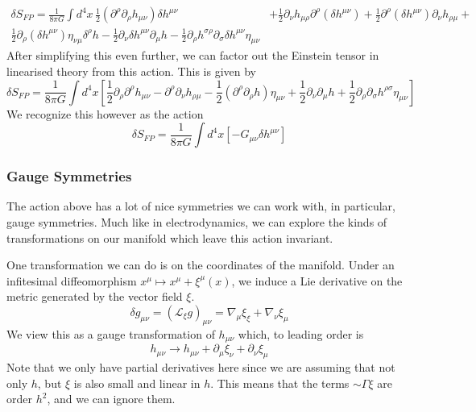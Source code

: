 \begin{align*}
	\delta S _{ FP } = \frac{1}{ 8 \pi G } \int d ^ 4 x \, 
	\frac{1}{2 } \left( \partial  ^ \rho \partial  _ \rho h _{ \mu \nu }  \right)
	\delta h^{ \mu \nu } & + \frac{1}{2 } \partial  _ \nu 
	h _{ \mu \rho } \partial  ^ \rho \left( \delta h ^{ \mu \nu }  \right) 
	+ \frac{1}{2 } \partial  ^ \rho \left( \delta h ^{ \mu \nu }  \right) 
	\partial  _ \nu h _{ \rho \mu } + \\ \frac{1}{2 } 
	\partial  _ \rho \left( \delta h ^{ \mu \nu }   \right)  \eta _{ \nu \mu } 
	\delta ^ \rho h - \frac{1}{2 } \partial  _ \nu \delta h^{ \mu \nu } \partial  _ \mu h - \frac{1}{2 } \partial  _ \rho h ^{ \sigma \rho } \partial  _ \sigma \delta h ^{ \mu \nu } \eta _{ \mu \nu } 
\end{align*}
After simplifying this even further, 
we can factor out the Einstein tensor in 
linearised theory from this action. 
This is given by 
\[
	\delta S _{ FP }  = \frac{1}{8 \pi G } 
	\int d^ 4 x \left[ \frac{1}{2 } \partial  _ \rho \partial  ^ \rho 
	h _{ \mu \nu }  - \partial  ^ \rho \partial  _ \nu h _{ \rho \mu } 
- \frac{1}{2 } \left( \partial  ^ \rho \partial  _ \rho h  \right)  \eta _{ \mu \nu } + \frac{1}{2 } \partial  _ \nu \partial  _ \mu h + \frac{1}{2 } \partial  _ \rho \partial  _ \sigma h ^{ \rho \sigma } \eta _{ \mu \nu }  \right]   
\] We recognize this 
however as the action 
\[
 \delta S_{ FP }  = \frac{1}{8 \pi G } \int d ^ 4 x \left[   - 
 G _{ \mu \nu } \delta h ^{ \mu \nu } \right] 
\] 

\subsubsection{Gauge Symmetries}
The action above has a lot of 
nice symmetries we can work with, 
in particular, gauge symmetries. 
Much like in electrodynamics, we 
can explore the kinds of transformations 
on our manifold which leave this action 
invariant. 

One transformation we can do 
is on the coordinates of the manifold. 
Under an infitesimal diffeomorphism $ x ^ \mu \mapsto x ^ \mu + \xi ^ \mu ( x) $, 
we induce a Lie derivative on the metric generated 
by the vector field $ \xi $. 
 \[
	 \delta g _{ \mu \nu }  = \left( \mathcal{ L } _ \xi g  \right)  _{ \mu \nu } 
	  = \nabla _ \mu \xi _ \xi + \nabla _ \nu \xi _ \mu 
\] We view this as a gauge transformation of $ h _{ \mu \nu } $ 
which, to leading order is 
\[
 h _{ \mu \nu } \to h _{ \mu \nu } + \partial  _ \mu \xi_ \nu + \partial  _ \nu \xi _ \mu 
\] Note that we only have partial 
derivatives here since we are assuming that 
not only $ h $, but $ \xi $ is also small 
and linear in $ h$. This means that 
the terms $ \sim \Gamma \xi $ are order $ h ^ 2 $, 
and we can ignore them. 

